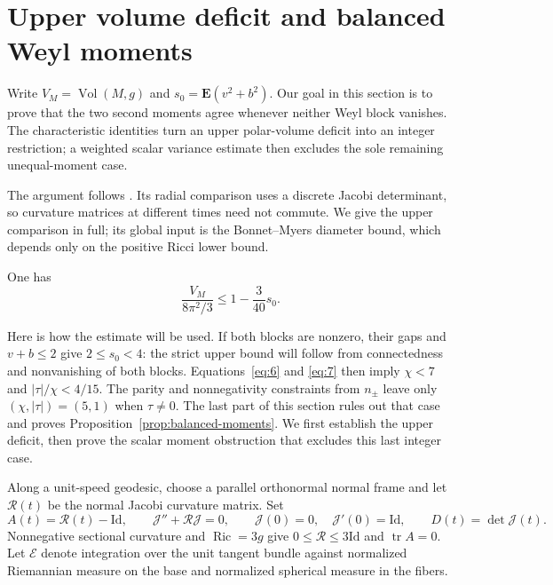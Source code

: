 \section{Upper volume deficit and balanced Weyl moments}
\label{sec:volume}

Write $V_M=\operatorname{Vol}(M,g)$ and $s_0=\mathbf E(v^2+b^2)$.
Our goal in this section is to prove that the two second moments agree
whenever neither Weyl block vanishes. The characteristic identities
turn an upper polar-volume deficit into an integer restriction; a
weighted scalar variance estimate then excludes the sole remaining
unequal-moment case.

The argument follows \cite[Propositions~4.1 and 4.9]{OpenAI2026P}.
Its radial comparison uses a discrete Jacobi determinant, so curvature
matrices at different times need not commute. We give the upper
comparison in full; its global input is the Bonnet--Myers diameter
bound, which depends only on the positive Ricci lower bound.

\begin{proposition}\label{prop:upper-volume-deficit}
One has
\[
 \frac{V_M}{8\pi^2/3}\le 1-\frac{3}{40}s_0.
 \tag{7}\label{eq:7}
\]
\end{proposition}

Here is how the estimate will be used. If both blocks are nonzero, their
gaps and $v+b\le2$ give $2\le s_0<4$: the strict upper bound
will follow from connectedness and nonvanishing of both blocks. Equations~\eqref{eq:6} and
\eqref{eq:7} then imply $\chi<7$ and $|\tau|/\chi<4/15$.
The parity and nonnegativity constraints from $n_\pm$ leave only
$(\chi,|\tau|)=(5,1)$ when $\tau\ne0$. The last part of this section
rules out that case and proves Proposition~\ref{prop:balanced-moments}.
We first establish the upper deficit, then prove the scalar moment
obstruction that excludes this last integer case.

Along a unit-speed geodesic, choose a parallel orthonormal normal frame
and let $\mathcal R(t)$ be the normal Jacobi curvature matrix.  Set
\[
 A(t)=\mathcal R(t)-\mathrm{Id},\qquad
 \mathcal J''+\mathcal R\mathcal J=0,\qquad
 \mathcal J(0)=0,\quad \mathcal J'(0)=\mathrm{Id},\qquad
 D(t)=\det\mathcal J(t).
\]
Nonnegative sectional curvature and $\operatorname{Ric}=3g$ give
$0\le\mathcal R\le3\mathrm{Id}$ and $\operatorname{tr}A=0$.
Let $\mathcal E$ denote integration over the unit tangent bundle against
normalized Riemannian measure on the base and normalized spherical
measure in the fibers.

